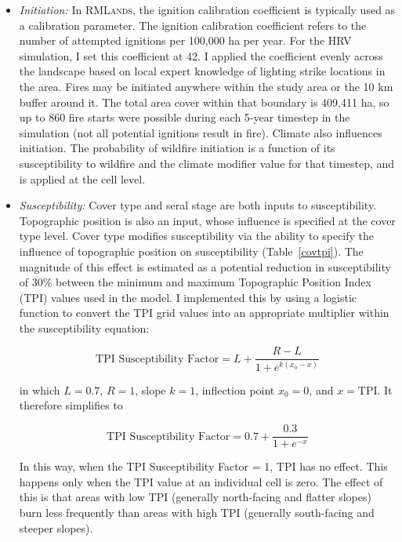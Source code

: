 \begin{itemize}
\item \emph{Initiation:} In \textsc{RMLands}, the ignition calibration coefficient is typically used as a calibration parameter. The ignition calibration coefficient refers to the number of attempted ignitions per 100,000 ha per year. For the HRV simulation, I set this coefficient at 42. I applied the coefficient evenly across the landscape based on local expert knowledge of lighting strike locations in the area. Fires may be initiated anywhere within the study area or the 10 km buffer around it. The total area cover within that boundary is 409,411 ha, so up to 860 fire starts were possible during each 5-year timestep in the simulation (not all potential ignitions result in fire). Climate also influences initiation. The probability of wildfire initiation is a function of its susceptibility to wildfire and the climate modifier value for that timestep, and is applied at the cell level.


\item \emph{Susceptibility:} Cover type and seral stage are both inputs to susceptibility. Topographic position is also an input, whose influence is specified at the cover type level. Cover type modifies susceptibility via the ability to specify the influence of topographic position on susceptibility (Table~\ref{covtpi}). The magnitude of this effect is estimated as a potential reduction in susceptibility of 30\% between the minimum and maximum Topographic Position Index (TPI) values used in the model. I implemented this by using a logistic function to convert the TPI grid values into an appropriate multiplier within the susceptibility equation:

$$\text{TPI Susceptibility Factor} = L + \frac{R-L}{1+e^{k(x_0-x)}}$$

in which $L= 0.7$, $R=1$, slope $k=1$, inflection point $x_0=0$, and $x=\text{TPI}$. %
It therefore simplifies to 

$$\text{TPI Susceptibility Factor} = 0.7 + \frac{0.3}{1+e^{-x}}$$

In this way, when the TPI Susceptibility Factor = 1, TPI has no effect. This happens only when the TPI value at an individual cell is zero. The effect of this is that areas with low TPI (generally north-facing and flatter slopes) burn less frequently than areas with high TPI (generally south-facing and steeper slopes).



\end{itemize}
